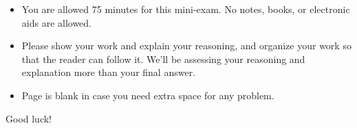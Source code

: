 \bigskip

\begin{itemize}
\item You are allowed 75 minutes for this mini-exam. No notes,
  books, or electronic aids are allowed.
  
\item Please show your work and explain your reasoning, and organize
  your work so that the reader can follow it.  We'll be assessing your
  reasoning and explanation more than your final answer.

\item Page \pageref{blank1} is blank in case you need extra space for
   any problem.
  
\end{itemize}

\large Good luck!

\smallskip
